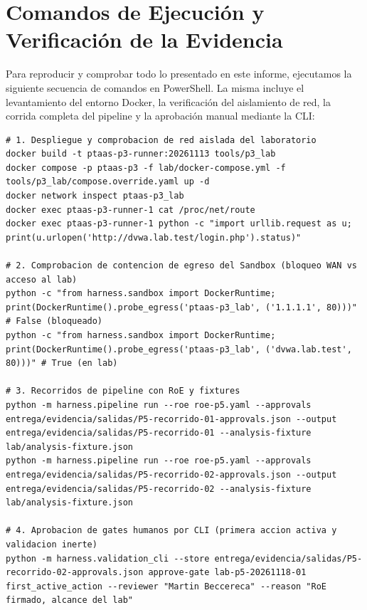 \documentclass[10pt,a4paper]{article}
\begin{document}
\clearpage
\section{Comandos de Ejecución y Verificación de la Evidencia}

Para reproducir y comprobar todo lo presentado en este informe, ejecutamos la siguiente secuencia de comandos en PowerShell. La misma incluye el levantamiento del entorno Docker, la verificación del aislamiento de red, la corrida completa del pipeline y la aprobación manual mediante la CLI:

\begin{lstlisting}[style=bashcommands]
# 1. Despliegue y comprobacion de red aislada del laboratorio
docker build -t ptaas-p3-runner:20261113 tools/p3_lab
docker compose -p ptaas-p3 -f lab/docker-compose.yml -f tools/p3_lab/compose.override.yaml up -d
docker network inspect ptaas-p3_lab
docker exec ptaas-p3-runner-1 cat /proc/net/route
docker exec ptaas-p3-runner-1 python -c "import urllib.request as u; print(u.urlopen('http://dvwa.lab.test/login.php').status)"

# 2. Comprobacion de contencion de egreso del Sandbox (bloqueo WAN vs acceso al lab)
python -c "from harness.sandbox import DockerRuntime; print(DockerRuntime().probe_egress('ptaas-p3_lab', ('1.1.1.1', 80)))"       # False (bloqueado)
python -c "from harness.sandbox import DockerRuntime; print(DockerRuntime().probe_egress('ptaas-p3_lab', ('dvwa.lab.test', 80)))" # True (en lab)

# 3. Recorridos de pipeline con RoE y fixtures
python -m harness.pipeline run --roe roe-p5.yaml --approvals entrega/evidencia/salidas/P5-recorrido-01-approvals.json --output entrega/evidencia/salidas/P5-recorrido-01 --analysis-fixture lab/analysis-fixture.json
python -m harness.pipeline run --roe roe-p5.yaml --approvals entrega/evidencia/salidas/P5-recorrido-02-approvals.json --output entrega/evidencia/salidas/P5-recorrido-02 --analysis-fixture lab/analysis-fixture.json

# 4. Aprobacion de gates humanos por CLI (primera accion activa y validacion inerte)
python -m harness.validation_cli --store entrega/evidencia/salidas/P5-recorrido-02-approvals.json approve-gate lab-p5-20261118-01 first_active_action --reviewer "Martin Beccereca" --reason "RoE firmado, alcance del lab"


\end{lstlisting}
\end{document}
